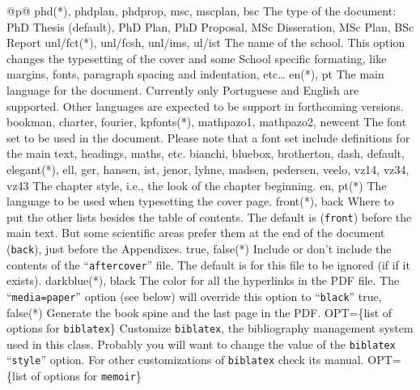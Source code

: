 \noindent
\begin{ctabular}{@{}p{\linewidth}@{}}
  \toprule
    {phd(*), phdplan, phdprop, msc, mscplan, bsc}%
    {The type of the document: PhD Thesis (default), PhD Plan, PhD Proposal, MSc Disseration, MSc Plan, BSc Report}
    \midrule
    {unl/fct(*), unl/fcsh, unl/ims, ul/ist}%
    {The name of the school. This option changes the typesetting of the cover and some School specific formating, like margins, fonts, paragraph spacing and indentation, etc…}
    \midrule
    {en(*), pt}%
    {The main language for the document.  Currently only Portuguese and English are supported.  Other languages are expected to be support in forthcoming versions.}
    \midrule
    {bookman, charter, fourier, kpfonts(*), mathpazo1, mathpazo2, newcent}%
    {The font set to be used in the document.  Please note that a font set include definitions for the main text, headings, maths, etc.}
    \midrule
    {bianchi, bluebox, brotherton, dash, default, elegant(*), ell, ger, hansen, ist, jenor, lyhne, madsen, pedersen, veelo, vz14, vz34, vz43}%
    {The chapter style, i.e., the look of the chapter beginning.}
    \midrule
    {en, pt(*)}%
    {The language to be used when typesetting the cover page.}
    \midrule
    {front(*), back}%
    {Where to put the other lists besides the table of contents. The default is (\texttt{front}) before the main text.  But some scientific areas prefer them at the end of the document (\texttt{back}), just before the Appendixes.}
    \midrule
    {true, false(*)}%
    {Include or don't include the contents of the “\texttt{aftercover}” file. The default is for this file to be ignored (if if it exists).}
    \midrule
    {darkblue(*), black}%
    {The color for all the hyperlinks in the PDF file.  The “\texttt{media=paper}” option (see below) will override this option to “\texttt{black}”}
    \midrule
    {true, false(*)}%
    {Generate the book spine and the last page in the PDF.}
    \midrule
    {OPT=\{list of options for \texttt{biblatex}\}}%
    {Customize \texttt{biblatex}, the bibliography management system used in this class. Probably you will want to change the value of the \texttt{biblatex} “\texttt{style}” option. For other customizations of \texttt{biblatex} check its manual.}
    \midrule
    {OPT=\{list of options for \texttt{memoir}\}}%

\end{ctabular}
